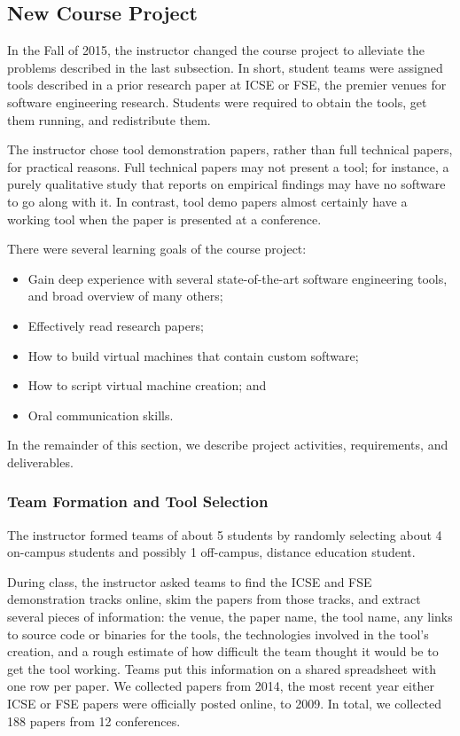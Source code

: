 \documentclass[10pt,conference]{IEEEtran}
\begin{document}
\subsection{New Course Project}\label{sec:thisProj}

In the Fall of 2015, the instructor changed the course project
to alleviate the problems described in the last subsection.
In short, student teams were assigned tools described in a 
prior research paper at ICSE or FSE, the premier 
venues for software engineering research.
Students were required to obtain the tools, get them running,
and redistribute them.

The instructor chose tool demonstration papers, rather than
full technical papers, for practical reasons.
Full technical papers may not present a tool; for 
instance, a purely qualitative study that reports on 
empirical findings may have no software to go along with it.
In contrast, tool demo papers almost certainly have a working
tool when the paper is presented at a conference. 

There were several learning goals of the course project:

\begin{itemize}
  \item Gain deep experience with several state-of-the-art
  		software engineering tools, and broad overview of many others;
  \item Effectively read research papers;
  \item How to build virtual machines that contain custom
  		software;
  \item How to script virtual machine creation; and
  \item Oral communication skills. 
\end{itemize}

In the remainder of this section, we describe project
activities, requirements, and deliverables.

\subsubsection{Team Formation and Tool Selection}

The instructor formed teams of about 5 students by randomly
selecting about 4 on-campus students and possibly 1 off-campus, distance
education student.

During class, the instructor asked teams to find the ICSE
and FSE demonstration tracks online, skim the papers from those
tracks, and extract several pieces of information:
the venue, the paper name, the tool name, any links to source
code or binaries for the tools, the technologies involved in the 
tool's creation, and a rough estimate of how 
difficult the team thought it would be to get the tool working.
Teams put this information on a shared spreadsheet with one row per paper.
We collected papers from 2014, the most recent year either ICSE or FSE
papers were officially posted online, to 2009.
In total, we collected 188 papers from 12 conferences.
\end{document}
